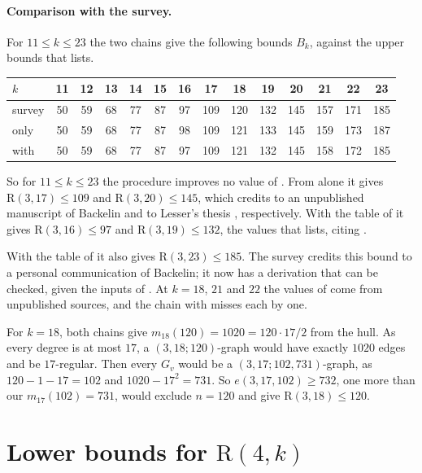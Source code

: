 \documentclass[11pt]{article}
\theoremstyle{spacedplain}
\theoremstyle{spaceddef}
\theoremstyle{spacedremark}
\newcommand{\R}{\mathrm{R}}
\begin{document}
\paragraph{Comparison with the survey.}
For $11\le k\le 23$ the two chains give the following bounds $B_k$, against the upper bounds that \cite{Rad26} lists.
\begin{center}\small\setlength{\tabcolsep}{4pt}
\begin{tabular}{l*{13}{c}}
\toprule
$k$ & 11 & 12 & 13 & 14 & 15 & 16 & 17 & 18 & 19 & 20 & 21 & 22 & 23\\
\midrule
survey \cite{Rad26} & 50 & 59 & 68 & 77 & 87 & 97 & 109 & 120 & 132 & 145 & 157 & 171 & 185\\
\cite{GR13} only & 50 & 59 & 68 & 77 & 87 & 98 & 109 & 121 & 133 & 145 & 159 & 173 & 187\\
with \cite{Back3} & 50 & 59 & 68 & 77 & 87 & 97 & 109 & 121 & 132 & 145 & 158 & 172 & 185\\
\bottomrule
\end{tabular}
\end{center}
So for $11\le k\le 23$ the procedure improves no value of \cite{Rad26}.
From \cite{GR13} alone it gives $\R(3,17)\le 109$ and $\R(3,20)\le 145$, which \cite{Rad26} credits to an unpublished manuscript of Backelin and to Lesser's thesis \cite{Les}, respectively.
With the table of \cite{Back3} it gives $\R(3,16)\le 97$ and $\R(3,19)\le 132$, the values that \cite{Rad26} lists, citing \cite{Back3}.

With the table of \cite{Back3} it also gives $\R(3,23)\le 185$.
The survey \cite{Rad26} credits this bound to a personal communication of Backelin; it now has a derivation that can be checked, given the inputs of \cite{Back3}.
At $k=18$, $21$ and $22$ the values of \cite{Rad26} come from unpublished sources, and the chain with \cite{Back3} misses each by one.

For $k=18$, both chains give $m_{18}(120)=1020=120\cdot 17/2$ from the hull.
As every degree is at most $17$, a $(3,18;120)$-graph would have exactly $1020$ edges and be $17$-regular.
Then every $G_v$ would be a $(3,17;102,731)$-graph, as $120-1-17=102$ and $1020-17^2=731$.
So $e(3,17,102)\ge 732$, one more than our $m_{17}(102)=731$, would exclude $n=120$ and give $\R(3,18)\le 120$.

\section{Lower bounds for \texorpdfstring{$\R(4,k)$}{R(4,k)}}\label{sec:r4k}
\end{document}
